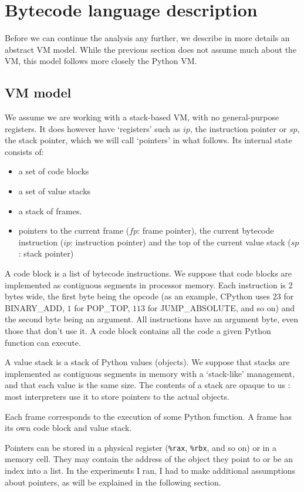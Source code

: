 \documentclass[english]{article}
\begin{document}
\section{Bytecode language description}

Before we can continue the analysis any further, we describe in more details an abstract VM model. While the previous section does not assume much about the VM, this model follows more closely the Python VM.

\subsection{VM model}

We assume we are working with a stack-based VM, with no general-purpose registers. It does however have `registers' such as $ip$, the instruction pointer or $sp$, the stack pointer, which we will call `pointers' in what follows. Its internal state consists of:
\begin{itemize}
	\item a set of code blocks 
	\item a set of value stacks 
	\item a stack of frames.  
	\item pointers to the current frame ($fp$: frame pointer), the current bytecode instruction ($ip$: instruction pointer) and the top of the current value stack ($sp$: stack pointer)
\end{itemize}

A code block is a list of bytecode instructions. We suppose that code blocks are implemented as contiguous segments in processor memory. Each instruction is 2 bytes wide, the first byte being the opcode (as an example, CPython uses $23$ for BINARY\_ADD, $1$ for POP\_TOP, $113$ for JUMP\_ABSOLUTE, and so on) and the second byte being an argument. All instructions have an argument byte, even those that don't use it. A code block contains all the code a given Python function can execute.

A value stack is a stack of Python values (objects). We suppose that stacks are implemented as contiguous segments in memory with a `stack-like' management, and that each value is the same size. The contents of a stack are opaque to us : most interpreters use it to store pointers to the actual objects.

Each frame corresponds to the execution of some Python function. A frame has its own code block and value stack.

Pointers can be stored in a physical register (\texttt{\%rax}, \texttt{\%rbx}, and so on) or in a memory cell. They may contain the address of the object they point to or be an index into a list. In the experiments I ran, I had to make additional assumptions about pointers, as will be explained in the following section.
\end{document}
